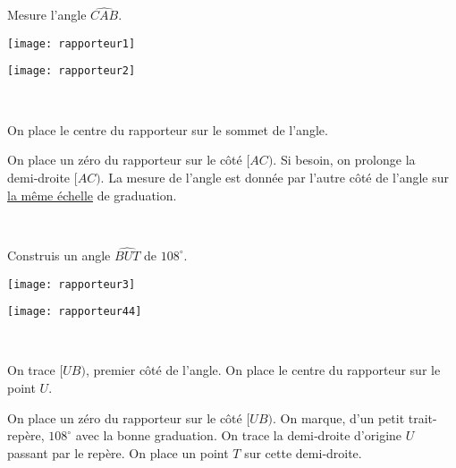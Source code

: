 \begin{methode*1}

\begin{exemple*1}
Mesure l'angle $\widehat{CAB}$. \\[0.75em]

\begin{minipage}[c]{0.49\textwidth}
\centering
\texttt{[image: rapporteur1]}
\end{minipage}\hfill%
 \begin{minipage}[c]{0.49\textwidth}%
 \centering
 \texttt{[image: rapporteur2]}
  \end{minipage} \\
 \begin{minipage}[c]{0.43\textwidth}
On place le centre du rapporteur sur le sommet de l'angle.
\end{minipage} \hfill%
 \begin{minipage}[c]{0.53\textwidth}
 On place un zéro du rapporteur sur le côté $[AC)$. Si besoin, on prolonge la demi‑droite $[AC)$. La mesure de l'angle est donnée par l'autre côté de l'angle sur \underline{la même échelle} de graduation.
 \end{minipage} \\
  \end{exemple*1}
 
 \begin{exemple*1}
Construis un angle $\widehat{BUT}$ de $108^\circ$.  \\[0.75em]

\begin{minipage}[c]{0.49\textwidth}
\centering
\texttt{[image: rapporteur3]}
\end{minipage}\hfill%
 \begin{minipage}[c]{0.49\textwidth}%
 \centering
 \texttt{[image: rapporteur44]}
  \end{minipage} \\
 \begin{minipage}[c]{0.43\textwidth}
On trace $[UB)$, premier côté de l'angle. On place le centre du rapporteur sur le point $U$.
\end{minipage} \hfill%
 \begin{minipage}[c]{0.53\textwidth}
 On place un zéro du rapporteur sur le côté $[UB)$. On marque, d'un petit trait-repère, $108^\circ$ avec la bonne graduation.
On trace la demi‑droite d'origine $U$ passant par le repère. On place un point $T$ sur cette demi‑droite.
  \end{minipage} \\
  \end{exemple*1}
 

\end{methode*1}
